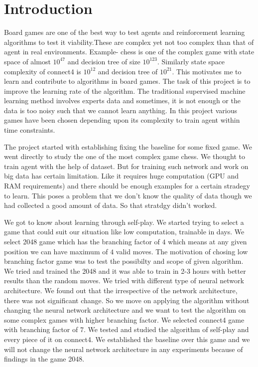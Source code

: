 \chapter{Introduction}
\hspace{3mm}
Board games are one of the best way to test agents and reinforcement learning algorithms to test it viability.These are complex yet not too complex than that of agent in real environments. Example- chess is one of the complex game with state space of almost $10^{47}$ and decision tree of size $10^{123}$. Similarly state space complexity of connect4 is $10^{12}$ and decision tree of $10^{21}$. This motivates me to learn and contribute to algorithms in board games. The task of this project is to improve the learning rate of the algorithm. The traditional supervised machine learning method involves experts data and sometimes, it is not enough or the data is too noisy such that we cannot learn anything. In this project various games have been chosen depending upon its complexity to train agent within time constraints.


The project started with establishing fixing the baseline for some fixed game. We went directly to study the one of the most complex game chess. We thought to train agent with the help of dataset. But for training such network and work on big data has certain limitation. Like it requires huge computation (GPU and RAM requirements) and there should be enough examples for a certain stradegy to learn. This poses a problem that we don't know the quality of data though we had collected a good amount of data. So that stratdgy didn't worked. 


We got to know about learning through self-play. We started trying to select a game that could suit our situation like low computation, trainable in days. We select 2048 game which has the branching factor of $4$ which means at any given position we can have maximum of $4$ valid moves. The motivation of chosing low branching factor game was to test the possibilty and scope of given algorithm. We tried and trained the 2048 and it was able to train in 2-3 hours with better results than the random moves. We tried with different type of neural network architecture. We found out that the irrespective of the network architecture, there was not significant change.
So we move on applying the algorithm without changing the neural network architecture and we want to test the algorithm on some complex games with higher branching factor. We selected connect4 game with branching factor of $7$. We tested and studied the algorithm of self-play and every piece of it on connect4. We established the baseline over this game and we will not change the neural network architecture in any experiments because of findings in the game 2048.


